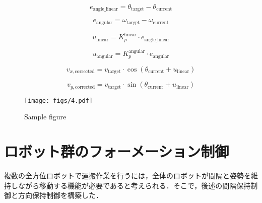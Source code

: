 \documentclass[a4jsme]{jsmepaper}
\begin{document}
\begin{equation}
   e_{\text{angle\_linear}} = \theta_{\text{target}} - \theta_{\text{current}}
\label{eq:angle_error_linear}
\end{equation}

\begin{equation}
   e_{\text{angular}} = \omega_{\text{target}} - \omega_{\text{current}}
\label{eq:angular_error}
\end{equation}

\begin{equation}
   u_{\text{linear}} = K_p^{\text{linear}} \cdot e_{\text{angle\_linear}}
\label{eq:pi_control_linear}
\end{equation}

\begin{equation}
   u_{\text{angular}} = K_p^{\text{angular}} \cdot e_{\text{angular}}
\label{eq:pi_control_angular}
\end{equation}

\begin{equation}
   v_{x,\text{corrected}} = v_{\text{target}} \cdot \cos \left( \theta_{\text{current}} + u_{\text{linear}} \right)
\label{eq:corrected_velocity_x}
\end{equation}

\begin{equation}
   v_{y,\text{corrected}} = v_{\text{target}} \cdot \sin \left( \theta_{\text{current}} + u_{\text{linear}} \right)
\label{eq:corrected_velocity_y}
\end{equation}


\begin{figure}[htbp]
  \begin{center}
  \vspace{1zh}
    \texttt{[image: figs/4.pdf]}
  \end{center}
  \caption{Sample figure}
  \label{fig:fig4}
\end{figure}


\section{ロボット群のフォーメーション制御}
複数の全方位ロボットで運搬作業を行うには，全体のロボットが間隔と姿勢を維持しながら移動する機能が必要であると考えられる．そこで，後述の間隔保持制御と方向保持制御を構築した．
\end{document}
